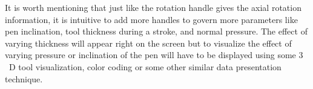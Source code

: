     It is worth mentioning that just like the rotation handle gives the axial rotation information, it is intuitive to add more handles to govern more parameters like pen inclination, tool thickness during a stroke, and normal pressure. The effect of varying thickness will appear right on the screen but to visualize the effect of varying pressure or inclination of the pen will have to be displayed using some $3$~D tool visualization, color coding or some other similar data presentation technique.
